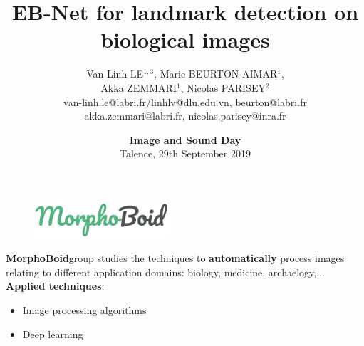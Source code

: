 \documentclass[10pt,svgnames]{beamer}
\title[Journée Image et Son] %
{ %
      \textbf{EB-Net  for landmark detection on biological images}
}
\author[V.L. Le, M. Beurton-Aimar, A. Zemmari, N. Parisey]
{      Van-Linh LE$^{1,3}$, Marie BEURTON-AIMAR$^{1}$,\\ Akka ZEMMARI$^{1}$, Nicolas PARISEY$^{2}$ \\[0.4cm]
      {\ttfamily\footnotesize{van-linh.le@labri.fr/linhlv@dlu.edu.vn, beurton@labri.fr\\
		akka.zemmari@labri.fr, nicolas.parisey@inra.fr \\    }
      }
}
\institute[]
{
      $^1$LaBRI-CNRS 5800, Bordeaux University, France\\
      $^2$IGEPP, INRA 1349 Rennes, France\\
      $^3$ITDLU, Dalat University, Vietnam
  
}
\date[I&S-2019]{\textbf{Image and Sound Day}\\Talence, 29th September 2019}
\begin{document}
{\morphoboid%
\begin{frame}
	\begin{figure}[!h]
		\centering
		\includegraphics[width=0.45\textwidth]{images/group}
	\end{figure}
	\textbf{MorphoBoid}\footnotemark[1] group studies the techniques to \textbf{automatically} process images relating to different application domains: biology, medicine, archaelogy,... \\[0.3cm]
\textbf{Applied techniques}:
\begin{itemize}
	\item Image processing algorithms
	\item Deep learning
\end{itemize}


\end{frame}}
\end{document}
